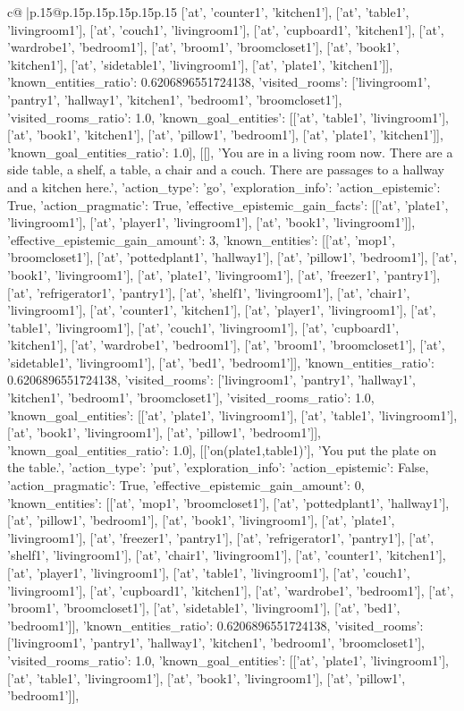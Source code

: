 \documentclass{article}
\begin{document}
{\begin{supertabular}{c@{$\;$}|p{.15\linewidth}@{}p{.15\linewidth}p{.15\linewidth}p{.15\linewidth}p{.15\linewidth}p{.15\linewidth}}
{{{['at', 'counter1', 'kitchen1'], ['at', 'table1', 'livingroom1'], ['at', 'couch1', 'livingroom1'], ['at', 'cupboard1', 'kitchen1'], ['at', 'wardrobe1', 'bedroom1'], ['at', 'broom1', 'broomcloset1'], ['at', 'book1', 'kitchen1'], ['at', 'sidetable1', 'livingroom1'], ['at', 'plate1', 'kitchen1']], 'known_entities_ratio': 0.6206896551724138, 'visited_rooms': ['livingroom1', 'pantry1', 'hallway1', 'kitchen1', 'bedroom1', 'broomcloset1'], 'visited_rooms_ratio': 1.0, 'known_goal_entities': [['at', 'table1', 'livingroom1'], ['at', 'book1', 'kitchen1'], ['at', 'pillow1', 'bedroom1'], ['at', 'plate1', 'kitchen1']], 'known_goal_entities_ratio': 1.0}}], [[], 'You are in a living room now. There are a side table, a shelf, a table, a chair and a couch. There are passages to a hallway and a kitchen here.', {'action_type': 'go', 'exploration_info': {'action_epistemic': True, 'action_pragmatic': True, 'effective_epistemic_gain_facts': [['at', 'plate1', 'livingroom1'], ['at', 'player1', 'livingroom1'], ['at', 'book1', 'livingroom1']], 'effective_epistemic_gain_amount': 3, 'known_entities': [['at', 'mop1', 'broomcloset1'], ['at', 'pottedplant1', 'hallway1'], ['at', 'pillow1', 'bedroom1'], ['at', 'book1', 'livingroom1'], ['at', 'plate1', 'livingroom1'], ['at', 'freezer1', 'pantry1'], ['at', 'refrigerator1', 'pantry1'], ['at', 'shelf1', 'livingroom1'], ['at', 'chair1', 'livingroom1'], ['at', 'counter1', 'kitchen1'], ['at', 'player1', 'livingroom1'], ['at', 'table1', 'livingroom1'], ['at', 'couch1', 'livingroom1'], ['at', 'cupboard1', 'kitchen1'], ['at', 'wardrobe1', 'bedroom1'], ['at', 'broom1', 'broomcloset1'], ['at', 'sidetable1', 'livingroom1'], ['at', 'bed1', 'bedroom1']], 'known_entities_ratio': 0.6206896551724138, 'visited_rooms': ['livingroom1', 'pantry1', 'hallway1', 'kitchen1', 'bedroom1', 'broomcloset1'], 'visited_rooms_ratio': 1.0, 'known_goal_entities': [['at', 'plate1', 'livingroom1'], ['at', 'table1', 'livingroom1'], ['at', 'book1', 'livingroom1'], ['at', 'pillow1', 'bedroom1']], 'known_goal_entities_ratio': 1.0}}], [['on(plate1,table1)'], 'You put the plate on the table.', {'action_type': 'put', 'exploration_info': {'action_epistemic': False, 'action_pragmatic': True, 'effective_epistemic_gain_amount': 0, 'known_entities': [['at', 'mop1', 'broomcloset1'], ['at', 'pottedplant1', 'hallway1'], ['at', 'pillow1', 'bedroom1'], ['at', 'book1', 'livingroom1'], ['at', 'plate1', 'livingroom1'], ['at', 'freezer1', 'pantry1'], ['at', 'refrigerator1', 'pantry1'], ['at', 'shelf1', 'livingroom1'], ['at', 'chair1', 'livingroom1'], ['at', 'counter1', 'kitchen1'], ['at', 'player1', 'livingroom1'], ['at', 'table1', 'livingroom1'], ['at', 'couch1', 'livingroom1'], ['at', 'cupboard1', 'kitchen1'], ['at', 'wardrobe1', 'bedroom1'], ['at', 'broom1', 'broomcloset1'], ['at', 'sidetable1', 'livingroom1'], ['at', 'bed1', 'bedroom1']], 'known_entities_ratio': 0.6206896551724138, 'visited_rooms': ['livingroom1', 'pantry1', 'hallway1', 'kitchen1', 'bedroom1', 'broomcloset1'], 'visited_rooms_ratio': 1.0, 'known_goal_entities': [['at', 'plate1', 'livingroom1'], ['at', 'table1', 'livingroom1'], ['at', 'book1', 'livingroom1'], ['at', 'pillow1', 'bedroom1']], }}}
\end{supertabular}}
\end{document}
